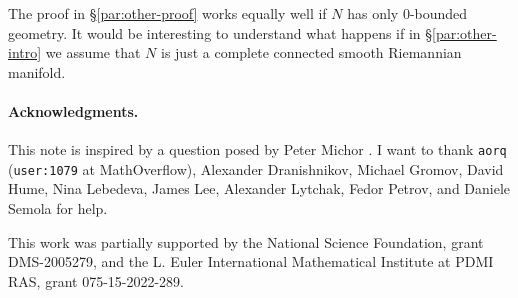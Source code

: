 \documentclass[a4paper,10pt]{article}
\begin{document}
The proof in §\ref{par:other-proof} works equally well if $N$ has only 0-bounded geometry. 
It would be interesting to understand what happens if in §\ref{par:other-intro} we assume that $N$ is just a complete connected smooth Riemannian manifold. 

\paragraph{Acknowledgments.} 
This note is inspired by a question posed by Peter Michor \cite{124840}.
I want to thank 
\texttt{aorq} (\texttt{user:1079} at MathOverflow),
Alexander Dranishnikov,
Michael Gromov,
David Hume,
Nina Lebedeva,
James Lee,
Alexander Lytchak, 
Fedor Petrov,
and
Daniele Semola
for help.

This work was partially supported by the National Science Foundation, grant DMS-2005279,
and the L. Euler International Mathematical Institute at PDMI RAS, grant 075-15-2022-289.


{\sloppy
\def\emph{\textit}
\printbibliography[heading=bibintoc]
\fussy
}
\end{document}
